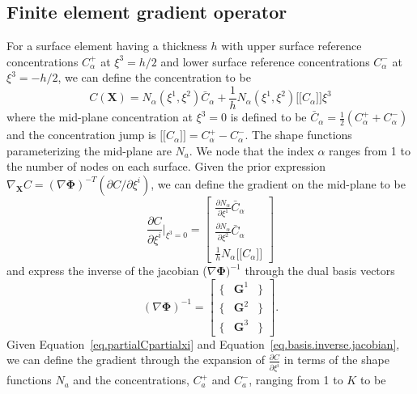 \documentclass[10pt]{elsarticle}
\newcommand{\mbs}[1]{\boldsymbol{#1}}
\def\ljump{\lbrack\!\lbrack}
\def\rjump{\rbrack\!\rbrack}
\def\bs{{\mbs{s}}} \def\bt{{\mbs{t}}} \def\bu{{\mbs{u}}}
\def\bPhi{{\mbs{\Phi}}}
\def\bs{\boldsymbol}
\begin{document}
\subsection{Finite element gradient operator}
 For a surface element having a thickness $h$ with upper surface reference concentrations $C_{\alpha}^{+}$ at $\xi^{3} = h/2$ and lower surface reference concentrations $C_{\alpha}^{-}$ at $\xi^{3} = -h/2$, we can define the concentration to be
\begin{equation}
\label{eq.fe.concentration} C(\bs{X}) = N_{\alpha}(\xi^{1},\xi^{2})\bar{C}_{\alpha} + \frac{1}{h} N_{\alpha}(\xi^{1},\xi^{2})\ljump C_{\alpha} \rjump \xi^{3}
\end{equation}
where the mid-plane concentration at $\xi^{3} = 0$ is defined to be $\bar{C}_{\alpha}  = \frac{1}{2}(C_{\alpha}^{+} + C_{\alpha}^{-})$ and the concentration jump is $\ljump C_{\alpha} \rjump = C_{\alpha}^{+} - C_{\alpha}^{-}$. The shape functions parameterizing the mid-plane are $N_{a}$. We node that the index $\alpha$ ranges from 1 to the number of nodes on each surface. Given the prior expression $\nabla_{\bs{X}}C = (\nabla \bPhi)^{-T}(\partial C / \partial \xi^{i})$, we can define the gradient on the mid-plane to be
\begin{equation}
\label{eq.partialCpartialxi} \frac{\partial C}{\partial \xi^{i}}\bigg|_{\xi^{3} = 0} = 
\begin{bmatrix} \frac{\partial N_{\alpha}}{\partial \xi^{1}}\bar{C}_{\alpha}   \\  \frac{\partial N_{\alpha}}{\partial \xi^{2}}\bar{C}_{\alpha} \\ \frac{1}{h} N_{\alpha} \ljump C_{\alpha} \rjump \end{bmatrix}
\end{equation}
and express the inverse of the jacobian ($\nabla \bPhi)^{-1}$ through the dual basis vectors
\begin{equation}
\label{eq.basis.inverse.jacobian}(\nabla \bPhi)^{-1} = 
\begin{bmatrix} 
\{  & \bs{G}^{1} & \} \\
\{  & \bs{G}^{2} & \} \\
\{  & \bs{G}^{3} & \}
 \end{bmatrix}.
\end{equation} 
Given Equation~\ref{eq.partialCpartialxi} and Equation~\ref{eq.basis.inverse.jacobian}, we can define the gradient through the expansion of $\frac{\partial C}{\partial \xi^{i}}$ in terms of the shape functions $N_{a}$ and the concentrations, $C_{a}^{+}$ and $C_{a}^{-}$, ranging from 1 to $K$ to be
\end{document}
